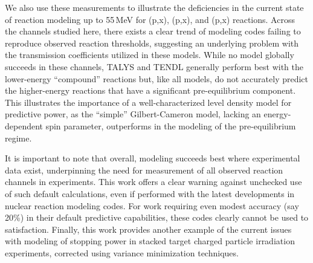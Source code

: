 We also use these measurements to illustrate the deficiencies in the current state of  reaction modeling up to 55\,MeV for  (p,x), (p,x), and  (p,x) reactions.
Across the channels studied here, there exists a clear trend of modeling codes failing to reproduce observed reaction thresholds, suggesting an underlying problem with the transmission coefficients utilized in these models.
While no model globally succeeds in these channels,   TALYS and TENDL generally perform best with the lower-energy \enquote{compound} reactions but, like all models, do not accurately predict the higher-energy reactions that have a significant pre-equilibrium component.
This illustrates the importance of a well-characterized level density model for predictive power, as the \enquote{simple} Gilbert-Cameron model, lacking an energy-dependent spin parameter,  outperforms in the modeling of the pre-equilibrium regime.


It is important to note that overall, modeling succeeds best where experimental data exist, underpinning the need for measurement of all observed reaction channels in experiments.
This work offers a clear warning against unchecked use of  such default calculations, even if performed with the latest developments in nuclear reaction modeling codes. 
For work requiring even modest accuracy (say 20\%) in their default predictive capabilities, these codes clearly cannot be used to satisfaction.   
Finally, this work provides another example of the current issues with modeling of  stopping power in stacked target charged particle irradiation experiments, corrected using variance minimization techniques.  
% 
% 





